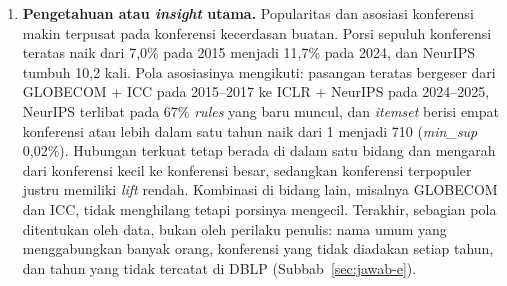 \begin{enumerate}
\item \textbf{Pengetahuan atau \textit{insight} utama.} Popularitas dan asosiasi konferensi makin terpusat pada konferensi kecerdasan buatan. Porsi sepuluh konferensi teratas naik dari 7,0\% pada 2015 menjadi 11,7\% pada 2024, dan NeurIPS tumbuh 10,2 kali. Pola asosiasinya mengikuti: pasangan teratas bergeser dari GLOBECOM + ICC pada 2015--2017 ke ICLR + NeurIPS pada 2024--2025, NeurIPS terlibat pada 67\% \textit{rules} yang baru muncul, dan \textit{itemset} berisi empat konferensi atau lebih dalam satu tahun naik dari 1 menjadi 710 (\textit{min\_sup} 0,02\%). Hubungan terkuat tetap berada di dalam satu bidang dan mengarah dari konferensi kecil ke konferensi besar, sedangkan konferensi terpopuler justru memiliki \textit{lift} rendah. Kombinasi di bidang lain, misalnya GLOBECOM dan ICC, tidak menghilang tetapi porsinya mengecil. Terakhir, sebagian pola ditentukan oleh data, bukan oleh perilaku penulis: nama umum yang menggabungkan banyak orang, konferensi yang tidak diadakan setiap tahun, dan tahun yang tidak tercatat di DBLP (Subbab~\ref{sec:jawab-e}).
\end{enumerate}

